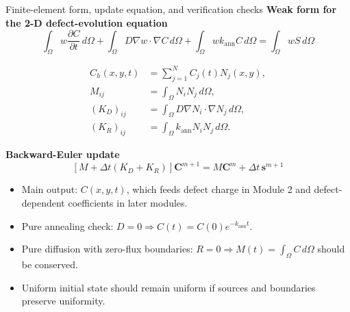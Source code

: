 \documentclass[aspectratio=169,10pt]{beamer}
\begin{document}
\begin{frame}{Finite-element form, update equation, and verification checks}
\footnotesize
\textbf{Weak form for the 2-D defect-evolution equation}
\vspace{-0.25em}
\begin{equation*}
\boxed{
\int_{\Omega} w\frac{\partial C}{\partial t}\,d\Omega
+
\int_{\Omega}D\nabla w\cdot\nabla C\,d\Omega
+
\int_{\Omega}wk_{\mathrm{ann}}C\,d\Omega
=
\int_{\Omega}wS\,d\Omega
}
\end{equation*}

\vspace{-0.35em}
\begin{align*}
C_h(x,y,t)&=\sum_{j=1}^{N}C_j(t)N_j(x,y),\\[-0.15em]
M_{ij}&=\int_{\Omega}N_iN_j\,d\Omega,\\[-0.15em]
(K_D)_{ij}&=\int_{\Omega}D\nabla N_i\cdot\nabla N_j\,d\Omega,\\[-0.15em]
(K_R)_{ij}&=\int_{\Omega}k_{\mathrm{ann}}N_iN_j\,d\Omega.
\end{align*}

\vspace{-0.35em}
\textbf{Backward-Euler update}
\vspace{-0.2em}
\begin{equation*}
\boxed{
\left[M+\Delta t(K_D+K_R)\right]\bm C^{m+1}
=
M\bm C^{m}+\Delta t\,\bm s^{m+1}
}
\end{equation*}

\vspace{-0.35em}
\begin{itemize}
    \item Main output: $C(x,y,t)$, which feeds defect charge in Module 2 and defect-dependent coefficients in later modules.
    \item Pure annealing check: $D=0\Rightarrow C(t)=C(0)e^{-k_{\mathrm{ann}}t}$.
    \item Pure diffusion with zero-flux boundaries: $R=0\Rightarrow M(t)=\int_{\Omega}C\,d\Omega$ should be conserved.
    \item Uniform initial state should remain uniform if sources and boundaries preserve uniformity.
\end{itemize}
\end{frame}
\end{document}
